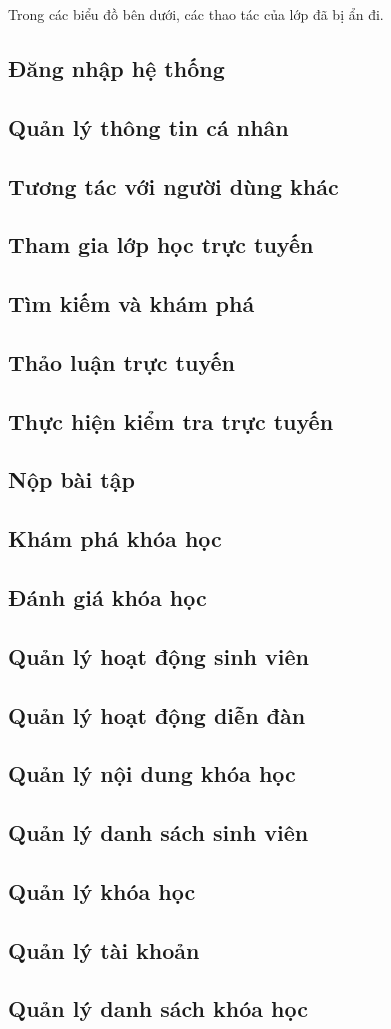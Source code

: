 \documentclass[./../main_file.tex]{subfiles}
\begin{document}
Trong các biểu đồ bên dưới, các thao tác của lớp đã bị ẩn đi.

\subsection{Đăng nhập hệ thống}
\subsection{Quản lý thông tin cá nhân}
\subsection{Tương tác với người dùng khác}
\subsection{Tham gia lớp học trực tuyến}
\subsection{Tìm kiếm và khám phá}
\subsection{Thảo luận trực tuyến}
\subsection{Thực hiện kiểm tra trực tuyến}
\subsection{Nộp bài tập}
\subsection{Khám phá khóa học}
\subsection{Đánh giá khóa học}
\subsection{Quản lý hoạt động sinh viên}
\subsection{Quản lý hoạt động diễn đàn}
\subsection{Quản lý nội dung khóa học}
\subsection{Quản lý danh sách sinh viên}
\subsection{Quản lý khóa học}
\subsection{Quản lý tài khoản}
\subsection{Quản lý danh sách khóa học}
\end{document}
